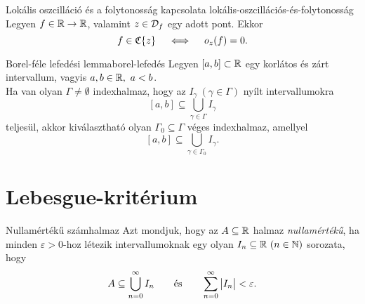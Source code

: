 \documentclass[
]{elteikthesis}[2024/04/26]
\begin{document}
	
	\begin{lemma}{Lokális oszcilláció és a folytonosság kapcsolata}%
		         {lokális-oszcillációs-és-folytonosság}
		Legyen \( f \in \mathbb{R} \to \mathbb{R} \), valamint \( z \in \mathcal{D}_{f} \) egy adott pont.
		Ekkor
		\[
			f \in \mathfrak{C} \{ z \}
			\quad \iff \quad
			o_z(f) = 0.
		\]
	\end{lemma}
	
	
	\begin{lemma}{Borel-féle lefedési lemma}{borel-lefedés}
		Legyen \( [a, b] \subset \mathbb{R} \) egy korlátos és zárt intervallum, 
		vagyis \( a, b \in \mathbb{R}, \ a < b \).\\[6pt]
		Ha van olyan \( \Gamma \neq \emptyset \) indexhalmaz, hogy az
		\( I_\gamma \ (\gamma \in \Gamma) \) nyílt intervallumokra
		\[
			[a, b] \subseteq \bigcup_{\gamma \in \Gamma} I_\gamma
		\]
		teljesül, akkor kiválasztható olyan \( \Gamma_0 \subseteq \Gamma \) véges indexhalmaz, amellyel
		\[
			[a, b] \subseteq \bigcup_{\gamma \in \Gamma_0} I_\gamma.
		\]
	\end{lemma}
	
	\section{Lebesgue-kritérium}
	
	\begin{definition}{Nullamértékű számhalmaz}{}
		Azt mondjuk, hogy az \( A \subseteq \mathbb{R} \) halmaz \emph{nullamértékű}, 
		ha minden \( \varepsilon > 0 \)-hoz létezik intervallumoknak egy olyan 
		\( I_n \subseteq \mathbb{R} \ (n \in \mathbb{N}) \) sorozata, hogy
		\[
			A \subseteq \bigcup_{n=0}^{\infty} I_n
			\qquad \text{és} \qquad
			\sum_{n=0}^{\infty} \abs\big{ I_n } < \varepsilon.
		\]
	\end{definition}
	
\end{document}

